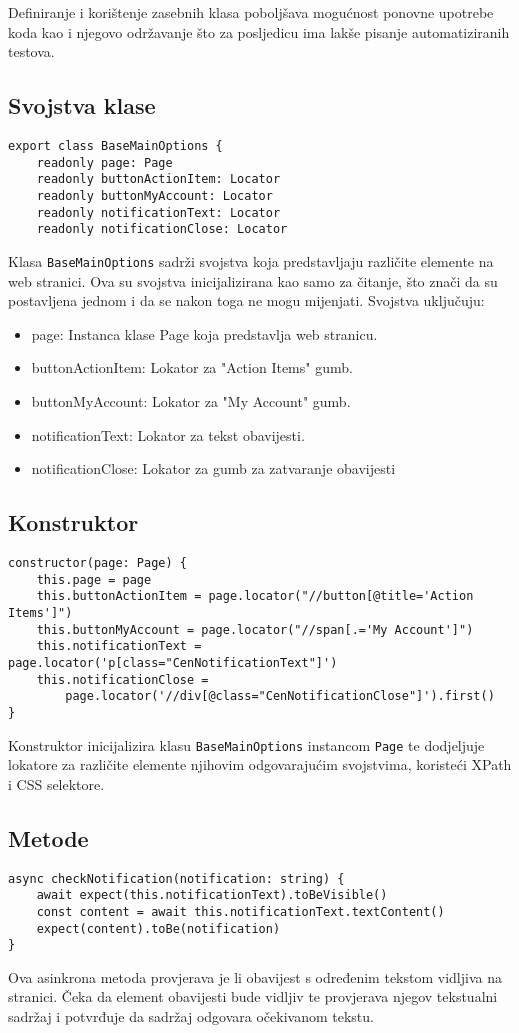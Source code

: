 Definiranje i korištenje zasebnih klasa poboljšava mogućnost ponovne upotrebe koda kao i njegovo održavanje što za posljedicu ima lakše pisanje automatiziranih testova.

\subsection{Svojstva klase}
\begin{verbatim}
export class BaseMainOptions {
    readonly page: Page
    readonly buttonActionItem: Locator
    readonly buttonMyAccount: Locator
    readonly notificationText: Locator
    readonly notificationClose: Locator
\end{verbatim}
Klasa \texttt{BaseMainOptions} sadrži svojstva koja predstavljaju različite elemente na web stranici. Ova su svojstva inicijalizirana kao samo za čitanje, što znači da su postavljena jednom i da se nakon toga ne mogu mijenjati. Svojstva uključuju:
\begin{itemize}
    \item page: Instanca klase Page koja predstavlja web stranicu.
    \item buttonActionItem: Lokator za "Action Items" gumb.
    \item buttonMyAccount: Lokator za "My Account" gumb.
    \item notificationText: Lokator za tekst obavijesti.
    \item notificationClose: Lokator za gumb za zatvaranje obavijesti
\end{itemize}

\subsection{Konstruktor}
\begin{verbatim}
constructor(page: Page) {
    this.page = page
    this.buttonActionItem = page.locator("//button[@title='Action Items']")
    this.buttonMyAccount = page.locator("//span[.='My Account']")
    this.notificationText = page.locator('p[class="CenNotificationText"]')
    this.notificationClose = 
        page.locator('//div[@class="CenNotificationClose"]').first()
}
\end{verbatim}
Konstruktor inicijalizira klasu \texttt{BaseMainOptions} instancom \texttt{Page} te dodjeljuje lokatore za različite elemente njihovim odgovarajućim svojstvima, koristeći XPath i CSS selektore.

\subsection{Metode}
\begin{verbatim}
async checkNotification(notification: string) {
    await expect(this.notificationText).toBeVisible()
    const content = await this.notificationText.textContent()
    expect(content).toBe(notification)
}
\end{verbatim}
Ova asinkrona metoda provjerava je li obavijest s određenim tekstom vidljiva na stranici. Čeka da element obavijesti bude vidljiv te provjerava njegov tekstualni sadržaj i potvrđuje da sadržaj odgovara očekivanom tekstu.

